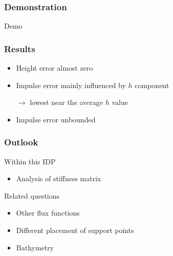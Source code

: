 \documentclass{beamer}
\newcommand{\backupend}{
   \addtocounter{framenumbervorappendix}{-\value{framenumber}}
   \addtocounter{framenumber}{\value{framenumbervorappendix}} 
}
\newcommand{\todo}[1]{
  \textcolor{red}{TODO: #1}
  \note{\textcolor{red}{TODO: #1}}
}
\renewcommand{\todo}[1]{}
\newcommand{\pd}[2]{\dfrac{\partial #1}{\partial #2}}
\renewcommand{\phi}{\varphi}
\begin{document}
\begin{frame}
  \frametitle{Demonstration}
  \begin{center}
    \Large{Demo}
  \end{center}
\end{frame}

\begin{frame}
  \frametitle{Results}
  \begin{itemize}
  \item Height error almost zero
  \item Impulse error mainly influenced by $h$ component

  $\rightarrow$ lowest near the average $h$ value
  \item Impulse error unbounded
  \end{itemize}
\end{frame}

\begin{frame}
  \frametitle{Outlook}
  \begin{block}{Within this IDP}
    \begin{itemize}
    \item Analysis of stiffness matrix
    \end{itemize}
  \end{block}
  \begin{block}{Related questions}
    \begin{itemize}
    \item Other flux functions \todo{Beispiele?}
    \item Different placement of support points
    \item Bathymetry
    \end{itemize}
  \end{block}
\end{frame}

\backupend
\end{document}
